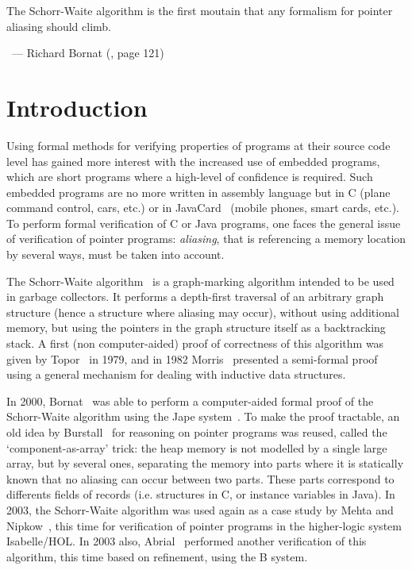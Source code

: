 


\hfill\begin{minipage}{0.42\textwidth}
\begin{slshape}
The Schorr-Waite algorithm is the first moutain that any formalism for
pointer aliasing should climb.
\end{slshape}

~\hfill --- Richard Bornat (\cite{bornat00mpc}, page 121)
\end{minipage}

\section{Introduction}

Using formal methods for verifying properties of programs at their
source code level has gained more interest with the increased use of
embedded programs, which are short programs where a high-level of
confidence is required. Such embedded programs are no more written in
assembly language but in C (plane command control, cars, etc.) or in
JavaCard~\cite{JavaCard} (mobile phones, smart cards, etc.).  To
perform formal verification of C or Java programs, one faces the
general issue of verification of pointer programs: \emph{aliasing},
that is referencing a memory location by several ways, must be taken
into account. 

The Schorr-Waite algorithm~\cite{schorr67cacm} is a graph-marking
algorithm intended to be used in garbage collectors. It performs a
depth-first traversal of an arbitrary graph structure (hence a
structure where aliasing may occur), without using additional memory,
but using the pointers in the graph structure itself as a backtracking
stack. A first (non computer-aided) proof of correctness of this
algorithm was given by Topor~\cite{topor79acta} in 1979, and in 1982
Morris~\cite{morris82} presented a semi-formal proof using a general
mechanism for dealing with inductive data structures.


In 2000, Bornat~\cite{bornat00mpc} was able to perform a
computer-aided formal proof of the Schorr-Waite algorithm using the
Jape system~\cite{bornat99}. To make the proof tractable, an old idea
by Burstall~\cite{burstall72} for reasoning on pointer programs was
reused, called the `component-as-array' trick: the heap memory is not
modelled by a single large array, but by several ones, separating the
memory into parts where it is statically known that no aliasing can
occur between two parts. These parts correspond to differents fields
of records (i.e. structures in C, or instance variables in Java).  In
2003, the Schorr-Waite algorithm was used again as a case study by
Mehta and Nipkow~\cite{mehta03cade}, this time for verification of
pointer programs in the higher-logic system Isabelle/HOL. In 2003
also, Abrial~\cite{abrial03fme} performed another verification of this
algorithm, this time based on refinement, using the B system.

